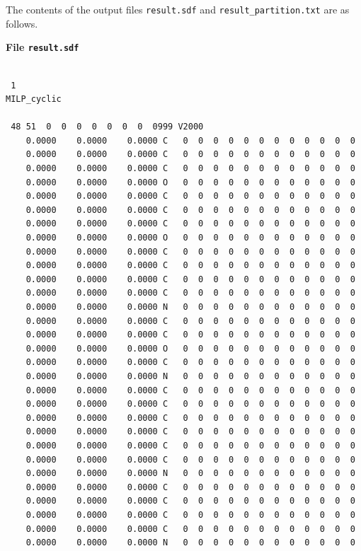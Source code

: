 \documentclass[11pt,titlepage,dvipdfmx,twoside]{book}
\begin{document}
The contents of the output files {\tt result.sdf} and
{\tt result\_partition.txt} are as follows.

\bigskip

\begin{oframed}
{\bf File {\tt result.sdf}}\\\\
\begin{verbatim}
 1
MILP_cyclic

 48 51  0  0  0  0  0  0  0  0999 V2000 
    0.0000    0.0000    0.0000 C   0  0  0  0  0  0  0  0  0  0  0  0
    0.0000    0.0000    0.0000 C   0  0  0  0  0  0  0  0  0  0  0  0
    0.0000    0.0000    0.0000 C   0  0  0  0  0  0  0  0  0  0  0  0
    0.0000    0.0000    0.0000 O   0  0  0  0  0  0  0  0  0  0  0  0
    0.0000    0.0000    0.0000 C   0  0  0  0  0  0  0  0  0  0  0  0
    0.0000    0.0000    0.0000 C   0  0  0  0  0  0  0  0  0  0  0  0
    0.0000    0.0000    0.0000 C   0  0  0  0  0  0  0  0  0  0  0  0
    0.0000    0.0000    0.0000 O   0  0  0  0  0  0  0  0  0  0  0  0
    0.0000    0.0000    0.0000 C   0  0  0  0  0  0  0  0  0  0  0  0
    0.0000    0.0000    0.0000 C   0  0  0  0  0  0  0  0  0  0  0  0
    0.0000    0.0000    0.0000 C   0  0  0  0  0  0  0  0  0  0  0  0
    0.0000    0.0000    0.0000 C   0  0  0  0  0  0  0  0  0  0  0  0
    0.0000    0.0000    0.0000 N   0  0  0  0  0  0  0  0  0  0  0  0
    0.0000    0.0000    0.0000 C   0  0  0  0  0  0  0  0  0  0  0  0
    0.0000    0.0000    0.0000 C   0  0  0  0  0  0  0  0  0  0  0  0
    0.0000    0.0000    0.0000 O   0  0  0  0  0  0  0  0  0  0  0  0
    0.0000    0.0000    0.0000 C   0  0  0  0  0  0  0  0  0  0  0  0
    0.0000    0.0000    0.0000 N   0  0  0  0  0  0  0  0  0  0  0  0
    0.0000    0.0000    0.0000 C   0  0  0  0  0  0  0  0  0  0  0  0
    0.0000    0.0000    0.0000 C   0  0  0  0  0  0  0  0  0  0  0  0
    0.0000    0.0000    0.0000 C   0  0  0  0  0  0  0  0  0  0  0  0
    0.0000    0.0000    0.0000 C   0  0  0  0  0  0  0  0  0  0  0  0
    0.0000    0.0000    0.0000 C   0  0  0  0  0  0  0  0  0  0  0  0
    0.0000    0.0000    0.0000 C   0  0  0  0  0  0  0  0  0  0  0  0
    0.0000    0.0000    0.0000 N   0  0  0  0  0  0  0  0  0  0  0  0
    0.0000    0.0000    0.0000 C   0  0  0  0  0  0  0  0  0  0  0  0
    0.0000    0.0000    0.0000 C   0  0  0  0  0  0  0  0  0  0  0  0
    0.0000    0.0000    0.0000 C   0  0  0  0  0  0  0  0  0  0  0  0
    0.0000    0.0000    0.0000 C   0  0  0  0  0  0  0  0  0  0  0  0
    0.0000    0.0000    0.0000 N   0  0  0  0  0  0  0  0  0  0  0  0

\end{verbatim}
\end{oframed}
\end{document}
